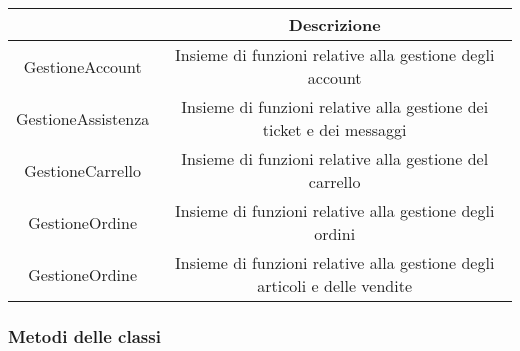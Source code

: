\documentclass[12pt,a4paper]{article}
\begin{document}
\begin{center}
\begin{tabular}{|c|c|}
\hline
\rowcolor[HTML]{C0C0C0} 
\rowcolor[HTML]{C0C0C0}  \multicolumn{1}{|c|}{\cellcolor[HTML]{C0C0C0}Classe}  &  Descrizione \\ \hline

GestioneAccount & \begin{minipage}{10cm} \vspace{5pt}
Insieme di funzioni relative alla gestione degli account \vspace{5pt}
\end{minipage} \\ \hline

GestioneAssistenza & \begin{minipage}{10cm} \vspace{5pt}
Insieme di funzioni relative alla gestione dei ticket e dei messaggi \vspace{5pt}
\end{minipage} \\ \hline

GestioneCarrello & \begin{minipage}{10cm} \vspace{5pt}
Insieme di funzioni relative alla gestione del carrello \vspace{5pt}
\end{minipage} \\ \hline

GestioneOrdine & \begin{minipage}{10cm} \vspace{5pt}
Insieme di funzioni relative alla gestione degli ordini \vspace{5pt}
\end{minipage} \\ \hline

GestioneOrdine & \begin{minipage}{10cm} \vspace{5pt}
Insieme di funzioni relative alla gestione degli articoli e delle vendite \vspace{5pt}
\end{minipage} \\ \hline

\end{tabular}
\end{center}
\newpage 

\subsubsection{Metodi delle classi}
\end{document}

